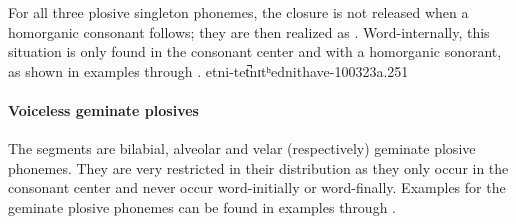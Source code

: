For all three plosive singleton phonemes, the closure is not released when a homorganic consonant %
follows; they are then realized as \ipa{[p̚ t̚ k̚\,]}. Word-internally, this situation is only found in the consonant center and with a homorganic sonorant, as shown in examples  through . 
{e{t}ni-t}{e{t̚}nɪtʰ}{ednit}{have-}{100323a}{.251}


\paragraph{Voiceless geminate plosives}
The segments  are bilabial, alveolar and velar (respectively) geminate plosive phonemes. They are very restricted in their distribution as they only occur in the consonant center %
and never occur word-initially or word-finally. %
Examples for the geminate plosive phonemes can be found in examples  through .

